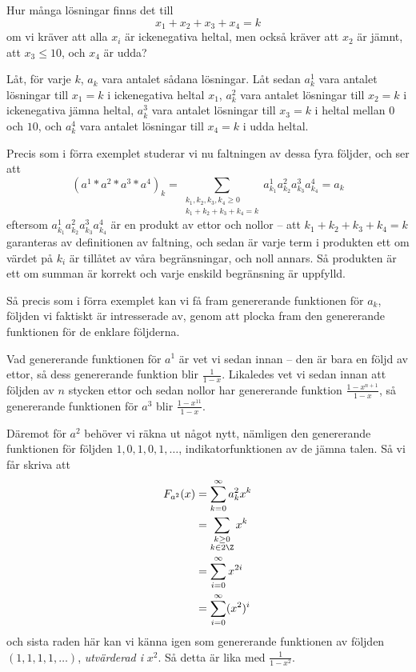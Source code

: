 \documentclass[nobib]{tufte-handout}
\begin{document}
\begin{example}
    Hur många lösningar finns det till
    $$x_1 + x_2 + x_3 + x_4 = k$$
    om vi kräver att alla $x_i$ är ickenegativa heltal, men också kräver att $x_2$ är jämnt, att $x_3 \leq 10$, och $x_4$ är udda?

    Låt, för varje $k$, $a_k$ vara antalet sådana lösningar.
    Låt sedan $a_k^1$ vara antalet lösningar till $x_1 = k$ i ickenegativa heltal $x_1$,
    $a_k^2$ vara antalet lösningar till $x_2=k$ i ickenegativa jämna heltal,
    $a_k^3$ vara antalet lösningar till $x_3=k$ i heltal mellan $0$ och $10$,
    och $a_k^4$ vara antalet lösningar till $x_4 = k$ i udda heltal.

    Precis som i förra exemplet studerar vi nu faltningen av dessa fyra följder, och ser att
    $$(a^1 * a^2 * a^3 * a^4)_k = \sum_{\substack{k_1, k_2, k_3, k_4\geq 0\\k_1 + k_2 + k_3 + k_4 = k}} a_{k_1}^1a_{k_2}^2a_{k_3}^3a_{k_4}^4 = a_k$$
    eftersom $a_{k_1}^1a_{k_2}^2a_{k_3}^3a_{k_4}^4$ är en produkt av ettor och nollor -- att $k_1 + k_2 + k_3 + k_4 = k$ garanteras av definitionen av faltning, och sedan är varje term i produkten ett om värdet på $k_i$ är tillåtet av våra begränsningar, och noll annars. Så produkten är ett om summan är korrekt och varje enskild begränsning är uppfylld.

    Så precis som i förra exemplet kan vi få fram genererande funktionen för $a_k$, följden vi faktiskt är intresserade av, genom att plocka fram den genererande funktionen för de enklare följderna.

    Vad genererande funktionen för $a^1$ är vet vi sedan innan -- den är bara en följd av ettor, så dess genererande funktion blir $\frac{1}{1-x}$. Likaledes vet vi sedan innan att följden av $n$ stycken ettor och sedan nollor har genererande funktion $\frac{1 - x^{n+1}}{1-x}$, så genererande funktionen för $a^3$ blir $\frac{1 - x^{11}}{1-x}$.

    Däremot för $a^2$ behöver vi räkna ut något nytt, nämligen den genererande funktionen för följden $1,0,1,0,1,\ldots$, indikatorfunktionen av de jämna talen. Så vi får skriva att
    \begin{align*}
        F_{a^2}(x) &= \sum_{k=0}^{\infty} a^2_k x^k\\
        &= \sum_{\substack{k \geq 0\\k \in 2\Z}} x^k\\
        &= \sum_{i=0}^{\infty} x^{2i}\\
        &= \sum_{i=0}^{\infty} (x^2)^i
    \end{align*}
    och sista raden här kan vi känna igen som genererande funktionen av följden $(1,1,1,1,\ldots)$, \emph{utvärderad i} $x^2$. Så detta är lika med $\frac{1}{1-x^2}$.


\end{example}
\end{document}
